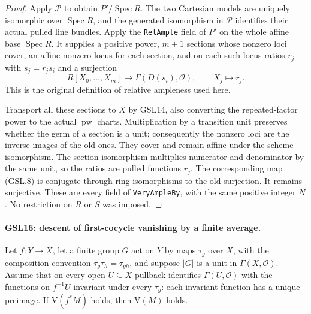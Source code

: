 \begin{proof}
Apply $\mathcal P$ to obtain $P'/\operatorname{Spec}R$.
The two Cartesian models are uniquely isomorphic over
$\operatorname{Spec}R$, and the generated isomorphism in
$\mathcal P$ identifies their actual pulled line bundles.
Apply the \texttt{RelAmple} field of $P'$ on the whole affine
base $\operatorname{Spec}R$.  It supplies a positive power,
$m+1$ sections whose nonzero loci cover, an affine nonzero
locus for each section, and on each such locus ratios $r_j$
with $s_j=r_js_i$ and a surjection
\[
 R[X_0,\ldots,X_m]\longrightarrow
 \Gamma(D(s_i),\mathcal O),\qquad X_j\longmapsto r_j.
 \tag{GSL.8}
\]
This is the original definition of relative ampleness used here.

Transport all these sections to $X$ by GSL14, also converting
the repeated-factor power to the actual $\operatorname{pw}$
charts.  Multiplication by a transition unit preserves whether
the germ of a section is a unit; consequently the nonzero
loci are the inverse images of the old ones.  They cover and
remain affine under the scheme isomorphism.  The section
isomorphism multiplies numerator and denominator by the
same unit, so the ratios are pulled functions $r_j$.
The corresponding map (GSL.8) is conjugate through ring
isomorphisms to the old surjection.  It remains surjective.
These are every field of \texttt{VeryAmpleBy}, with the same
positive integer $N$.  No restriction on $R$ or $S$ was imposed.
\end{proof}

\paragraph{GSL16: descent of first-cocycle vanishing by a finite average.}
\label{claim:GSL16}
Let $f:Y\to X$, let a finite group $G$ act on $Y$ by maps
$\tau_g$ over $X$, with the composition convention
$\tau_g\tau_h=\tau_{gh}$, and suppose $|G|$ is a unit in
$\Gamma(X,\mathcal O)$.  Assume that on every open $U\subseteq X$
pullback identifies $\Gamma(U,\mathcal O)$ with the functions on
$f^{-1}U$ invariant under every $\tau_g$: each invariant function
has a unique preimage.  If $\mathrm V(f^*M)$ holds, then
$\mathrm V(M)$ holds.

